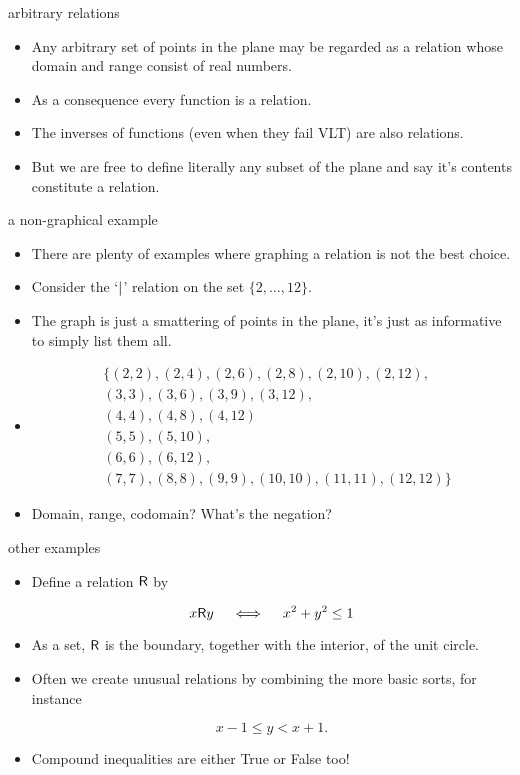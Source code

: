 \documentclass[landscape]{beamer}
\begin{document}
\begin{frame}{arbitrary relations}
\begin{itemize}
\item Any arbitrary set of points in the plane may be regarded as a relation whose domain and range consist of real numbers. \pause
\item As a consequence every function is a relation. \pause
\item The inverses of functions (even when they fail VLT) are also relations. \pause
\item But we are free to define literally any subset of the plane and say it's contents constitute a relation.
\end{itemize}
\end{frame}

\begin{frame}{a non-graphical example}
\begin{itemize}
\item There are plenty of examples where graphing a relation is not the best choice. \pause
\item Consider the `$\,\!\mid\!\,$' relation on the set $\{2,  \ldots , 12\}.$\pause
\item The graph is just a smattering of points in the plane, it's just as informative to simply list them all.\pause
\item 
\begin{align*}
& \{ (2,2), (2,4), (2,6), (2,8), (2,10), (2,12), \\
& (3,3), (3,6), (3,9), (3,12), \\ 
& (4,4), (4, 8), (4,12) \\
& (5,5), (5,10), \\
& (6,6), (6,12), \\
& (7,7), (8,8), (9,9), (10,10), (11,11), (12,12) \} 
\end{align*}
\pause
\item Domain, range, codomain?  \pause What's the negation?
\end{itemize}
\end{frame}

\begin{frame}{other examples}
\begin{itemize}
\item Define a relation $\mbox{\textsf R}$ by

\[ x \mbox{\textsf R} y \quad \iff \quad x^2+y^2 \leq 1 \]

\pause

\item As a set, $\mbox{\textsf R}$ is the boundary, together with the interior, of the unit circle. \pause 

\item Often we create unusual relations by combining the more basic sorts, for instance

\[ x-1 \leq y < x+1. \]
\pause

\item Compound inequalities are either True or False too!
\end{itemize}
\end{frame}
\end{document}
